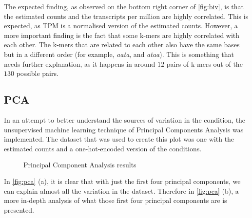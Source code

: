 \documentclass[11pt,twoside]{article}
\numberwithin{Theorem}{section}
\numberwithin{Definition}{section}
\numberwithin{Lemma}{section}
\numberwithin{Algorithm}{section}
\numberwithin{equation}{section}
\begin{document}
The expected finding, as observed on the bottom right corner of \autoref{fig:biv}, is that the estimated counts and the transcripts per million are highly correlated. This is expected, as TPM is a normalised version of the estimated counts. However, a more important finding is the fact that some k-mers are highly correlated with each other. The k-mers that are related to each other also have the same bases but in a different order (for example, \emph{aata}, and \emph{ataa}). This is something that needs further explanation, as it happens in around $12$ pairs of k-mers out of the $130$ possible pairs. 

\subsection{PCA}
\label{sec:pca}

In an attempt to better understand the sources of variation in the condition, the unsupervised machine learning technique of Principal Components Analysis was implemented. The dataset that was used to create this plot was one with the estimated counts and a one-hot-encoded version of the conditions.

\begin{figure}[h]
    \centering
    \caption{Principal Component Analysis results}
    \label{fig:pca}
\end{figure}

In \autoref{fig:pca} (a), it is clear that with just the first four principal components, we can explain almost all the variation in the dataset. Therefore in \autoref{fig:pca} (b), a more in-depth analysis of what those first four principal components are is presented. 
\end{document}
